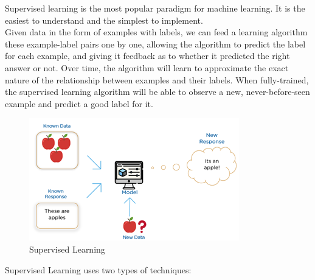 Supervised learning is the most popular paradigm for machine learning. It is the easiest to understand and the simplest to implement.\\
Given data in the form of examples with labels, we can feed a learning algorithm these example-label pairs one by one, allowing the algorithm to predict the label for each example, and giving it feedback as to whether it predicted the right answer or not. Over time, the algorithm will learn to approximate the exact nature of the relationship between examples and their labels. When fully-trained, the supervised learning algorithm will be able to observe a new, never-before-seen example and predict a good label for it.

\begin{figure}[htbp]
    \centering
	    \includegraphics[scale=0.4]{Figures/supervised.png}
        \caption[Supervised Learning]{Supervised Learning}
	    \label{fig:Supervised Learning}
\end{figure}

Supervised Learning uses two types of techniques:

